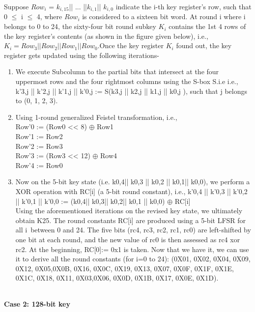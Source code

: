 \documentclass[journal=tosc,preprint]{iacrtrans}
\begin{document}
Suppose $Row_i$ = $k_{i,15}$|| ... ||$k_{i,1}$|| $k_{i,0}$ indicate the i-th key register’s row, such that 0 $\leq$ i $\leq$ 4, where $Row_i$ is considered to a sixteen bit word. At round i where i belongs to 0 to 24, the sixty-four bit round subkey $K_i$ contains the 1st 4 rows of the key register’s contents (as shown in the figure given below), i.e., $K_i = Row_3 || Row_2 || Row_1 || Row_0$.Once the key register $K_i$ found out, the key register gets updated using the following iterations-

\begin{enumerate}
\item We execute Subcolumn to the partial bits that intersect at the four uppermost rows and the four rightmost columns using the S-box S.i.e  i.e., k’3,j || k’2,j || k’1,j || k’0,j := S(k3,j || k2,j || k1,j || k0,j ), such that j belongs to (0, 1, 2, 3).\\
\item Using 1-round generalized Feistel transformation, i.e.,\\
Row'0 := (Row0 << 8) $\oplus$ Row1\\
Row'1 := Row2\\
Row'2 := Row3\\
Row'3 := (Row3 << 12) $\oplus$ Row4\\
Row'4 := Row0\\
\item  Now on the 5-bit key state (i.e. k0,4|| k0,3 || k0,2 || k0,1|| k0,0), we perform a XOR operation with RC[i] (a 5-bit round constant), i.e., k’0,4 || k’0,3 || k’0,2 || k’0,1 || k’0,0 := (k0,4|| k0,3|| k0,2|| k0,1 || k0,0) $\oplus$ RC[i]\\
Using the aforementioned iterations on the revised key state, we ultimately obtain K25. The round constants RC[i] are produced using a 5-bit LFSR for all i between 0 and 24. The five bits (rc4, rc3, rc2, rc1, rc0) are left-shifted by one bit at each round, and the new value of rc0 is then assessed as rc4 xor rc2. At the beginning, RC[0]:= 0x1 is taken. Now that we have it, we can use it to derive all the round constants (for i=0 to 24):  (0X01, 0X02, 0X04, 0X09, 0X12, 0X05,0X0B, 0X16, 0X0C, 0X19, 0X13, 0X07, 0X0F, 0X1F, 0X1E, 0X1C, 0X18, 0X11, 0X03,0X06, 0X0D, 0X1B, 0X17, 0X0E, 0X1D).
\end{enumerate}\\
\textbf{Case 2: 128-bit key}
\end{document}
